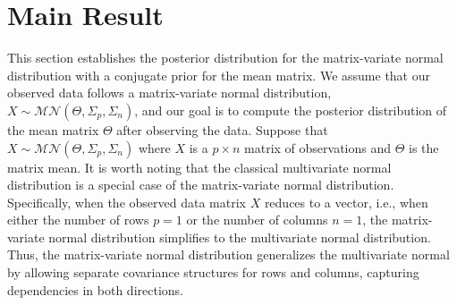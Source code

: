 \documentclass[twoside]{article}
\begin{document}
\section{Main Result}
This section establishes the posterior distribution for the matrix-variate normal distribution with a conjugate prior for the mean matrix. We assume that our observed data follows a matrix-variate normal distribution, $X \sim \mathcal{MN}(\Theta, \Sigma_p, \Sigma_n)$, and our goal is to compute the posterior distribution of the mean matrix $\Theta$ after observing the data. Suppose that $X \sim \mathcal{MN}(\Theta, \Sigma_p, \Sigma_n)$ where $X$ is a $p \times n$ matrix of observations and $\Theta$ is the matrix mean. 
It is worth noting that the classical multivariate normal distribution is a special case of the matrix-variate normal distribution. Specifically, when the observed data matrix $X$ reduces to a vector, i.e., when either the number of rows $p = 1$ or the number of columns $n = 1$, the matrix-variate normal distribution simplifies to the multivariate normal distribution.
Thus, the matrix-variate normal distribution generalizes the multivariate normal by allowing separate covariance structures for rows and columns, capturing dependencies in both directions.
\end{document}
